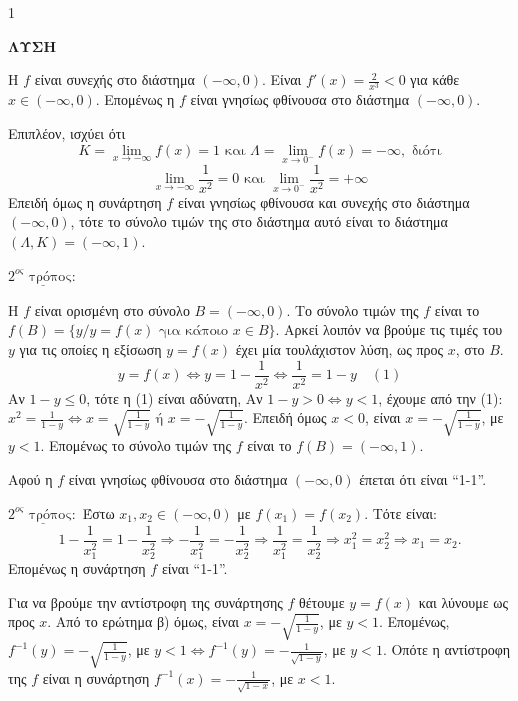 \begin{ylh}{1}
    \item [Λύση]
\end{ylh}
\textbf{ΛΥΣΗ}
\begin{alist}
\item Η $f$ είναι συνεχής στο διάστημα $(-\infty,0)$. Είναι $f'(x) = \frac{2}{x^3} < 0$ για κάθε $x \in (-\infty,0)$.
Επομένως η $f$ είναι γνησίως φθίνουσα στο διάστημα $(-\infty,0)$.
\item Επιπλέον, ισχύει ότι
\[ K = \lim_{x \to -\infty} f(x) = 1 \text{ και } \Lambda = \lim_{x \to 0^-} f(x) = -\infty, \text{ διότι} \]
\[ \lim_{x \to -\infty} \frac{1}{x^2} = 0 \text{ και } \lim_{x \to 0^-} \frac{1}{x^2} = +\infty \]
Επειδή όμως η συνάρτηση $f$ είναι γνησίως φθίνουσα και συνεχής στο διάστημα $(-\infty,0)$, τότε το σύνολο τιμών της στο διάστημα αυτό είναι το διάστημα $(\Lambda, K) = (-\infty, 1)$.

$\underline{2^{ος} \text{ τρόπος}:}$

Η $f$ είναι ορισμένη στο σύνολο $B = (-\infty,0)$.
Το σύνολο τιμών της $f$ είναι το $f(B) = \{y / y = f(x) \text{ για κάποιο } x \in B\}$.
Αρκεί λοιπόν να βρούμε τις τιμές του $y$ για τις οποίες η εξίσωση $y=f(x)$ έχει μία τουλάχιστον λύση, ως προς $x$, στο $B$.
\[ y = f(x) \Leftrightarrow y = 1 - \frac{1}{x^2} \Leftrightarrow \frac{1}{x^2} = 1 - y \quad (1) \]
Αν $1-y \leq 0$, τότε η (1) είναι αδύνατη,
Αν $1-y > 0 \Leftrightarrow y < 1$, έχουμε από την (1): $x^2 = \frac{1}{1-y} \Leftrightarrow x = \sqrt{\frac{1}{1-y}} \text{ ή } x = -\sqrt{\frac{1}{1-y}}$.
Επειδή όμως $x < 0$, είναι $x = -\sqrt{\frac{1}{1-y}}$, με $y < 1$.
Επομένως το σύνολο τιμών της $f$ είναι το $f(B) = (-\infty,1)$.
\item
\begin{rlist}
\item Αφού η $f$ είναι γνησίως φθίνουσα στο διάστημα $(-\infty,0)$ έπεται ότι είναι ``1-1''.

$\underline{2^{ος} \text{ τρόπος}:}$ Έστω $x_1, x_2 \in (-\infty,0)$ με $f(x_1) = f(x_2)$. Τότε είναι:
\[ 1 - \frac{1}{x_1^2} = 1 - \frac{1}{x_2^2} \Rightarrow -\frac{1}{x_1^2} = -\frac{1}{x_2^2} \Rightarrow \frac{1}{x_1^2} = \frac{1}{x_2^2} \Rightarrow x_1^2 = x_2^2 \Rightarrow x_1 = x_2. \]
Επομένως η συνάρτηση $f$ είναι ``1-1''.
\item Για να βρούμε την αντίστροφη της συνάρτησης $f$ θέτουμε $y = f(x)$ και λύνουμε ως προς $x$. Από το ερώτημα β) όμως, είναι $x = -\sqrt{\frac{1}{1-y}}$, με $y < 1$.
Επομένως, $f^{-1}(y) = -\sqrt{\frac{1}{1-y}}$, με $y < 1 \Leftrightarrow f^{-1}(y) = -\frac{1}{\sqrt{1-y}}$, με $y < 1$.
Οπότε η αντίστροφη της $f$ είναι η συνάρτηση $f^{-1}(x) = -\frac{1}{\sqrt{1-x}}$, με $x < 1$.
\end{rlist}
\end{alist}